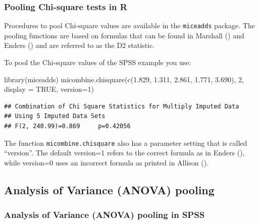 \documentclass[
]{book}
\newenvironment{Shaded}{\begin{snugshade}}{\end{snugshade}}
\newcommand{\AttributeTok}[1]{\textcolor[rgb]{0.77,0.63,0.00}{#1}}
\newcommand{\ConstantTok}[1]{\textcolor[rgb]{0.00,0.00,0.00}{#1}}
\newcommand{\DecValTok}[1]{\textcolor[rgb]{0.00,0.00,0.81}{#1}}
\newcommand{\FloatTok}[1]{\textcolor[rgb]{0.00,0.00,0.81}{#1}}
\newcommand{\FunctionTok}[1]{\textcolor[rgb]{0.00,0.00,0.00}{#1}}
\newcommand{\NormalTok}[1]{#1}
\begin{document}
\hypertarget{pooling-chi-square-tests-in-r}{%
\subsubsection{Pooling Chi-square tests in R}\label{pooling-chi-square-tests-in-r}}

Procedures to pool Chi-square values are available in the \texttt{miceadds} package. The pooling functions are based on formulas that can be found in Marshall (\citet{Marshall2009MedResMeth}) and Enders (\citet{enders2010applied}) and are referred to as the D2 statistic.

To pool the Chi-square values of the SPSS example you use:

\begin{Shaded}
\begin{Highlighting}[]
\FunctionTok{library}\NormalTok{(miceadds)}
\FunctionTok{micombine.chisquare}\NormalTok{(}\FunctionTok{c}\NormalTok{(}\FloatTok{1.829}\NormalTok{, }\FloatTok{1.311}\NormalTok{, }\FloatTok{2.861}\NormalTok{, }\FloatTok{1.771}\NormalTok{, }\FloatTok{3.690}\NormalTok{), }\DecValTok{2}\NormalTok{, }\AttributeTok{display =} \ConstantTok{TRUE}\NormalTok{, }\AttributeTok{version=}\DecValTok{1}\NormalTok{)}
\end{Highlighting}
\end{Shaded}

\begin{verbatim}
## Combination of Chi Square Statistics for Multiply Imputed Data
## Using 5 Imputed Data Sets
## F(2, 240.99)=0.869     p=0.42056
\end{verbatim}

The function \texttt{micombine.chisquare} also has a parameter setting that is called ``version''. The default version=1 refers to the correct formula as in Enders (\citet{enders2010applied}), while version=0 uses an incorrect formula as printed in Allison (\citet{Allison2002}).

\hypertarget{analysis-of-variance-anova-pooling}{%
\subsection{Analysis of Variance (ANOVA) pooling}\label{analysis-of-variance-anova-pooling}}

\hypertarget{analysis-of-variance-anova-pooling-in-spss}{%
\subsubsection{Analysis of Variance (ANOVA) pooling in SPSS}\label{analysis-of-variance-anova-pooling-in-spss}}
\end{document}
